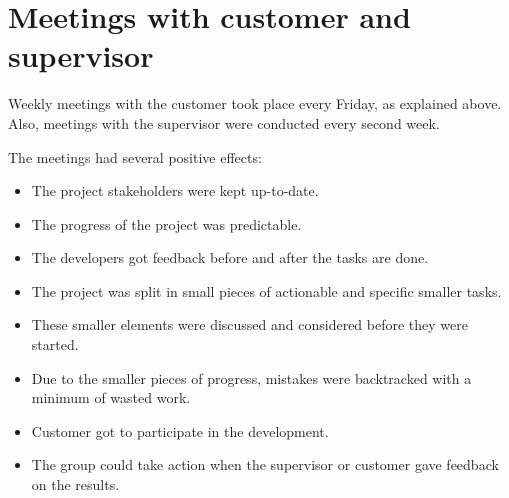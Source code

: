 \section{Meetings with customer and supervisor}
Weekly meetings with the customer took place every Friday, as explained above. Also, meetings with the supervisor were conducted every second week.

The meetings had several positive effects:
\begin{itemize}
\item The project stakeholders were kept up-to-date.
\item The progress of the project was predictable.
\item The developers got feedback before and after the tasks are done.
\item The project was split in small pieces of actionable and specific smaller tasks.
\item These smaller elements were discussed and considered before they were started.
\item Due to the smaller pieces of progress, mistakes were backtracked with a minimum of wasted work.
\item Customer got to participate in the development.
\item The group could take action when the supervisor or customer gave feedback on the results.
\end{itemize}

